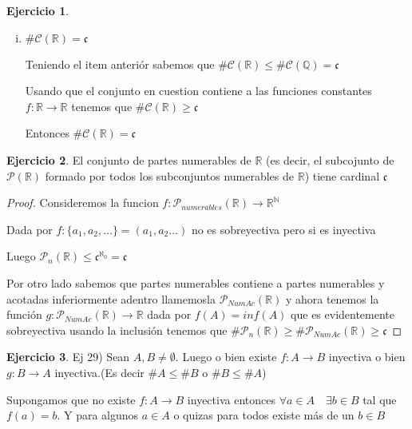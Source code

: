 \documentclass[12pt]{article}
\newcommand{\n}{\aleph_{0}}
\newcommand{\Q}{\mathbb{Q}}
\newcommand{\R}{\mathbb{R}}
\newcommand{\I}{\mathbb{I}}
\newcommand{\N}{\mathbb{N}}
\newcommand{\ra}{\rightarrow}
\theoremstyle{definition}
\newtheorem{ej}{Ejercicio}
\begin{document}
\begin{ej}
\begin{enumerate}[i.]
\begin{proof}
      Ahora tomemos una sucesión $(a_n)_n \in \Q$ tal que $a_n \ra i$ que existe por densidad, entonces por continuidad $f(a_n) \ra f(i) \neq g(i) \leftarrow g(a_n)$

      Como todos los términos de $a_n$ estan en $\Q$ sabemos que $f(a_n) = g(a_n) \quad \forall n \in \N$, pero entonces, dado que ambas convergen, tienen que converger a lo mismo

      Esto es absurdo , por que dijimos que no convergian a lo mismo, provino de suponer que existia dicho $i \in \I$ entonces no existe, por lo tanto $f(x) = g(x) \quad \forall x \in \R$
      \end{proof}
    \item $\# \mathcal{C}(\R) = \mathfrak{c}$

      Teniendo el item anteriór sabemos que $\# \mathcal{C}(\R) \leq \# \mathcal{C}(\Q) = \mathfrak{c}$

      Usando que el conjunto en cuestion contiene a las funciones constantes $f : \R \ra \R $ tenemos que $\# \mathcal{C}(\R) \geq \mathfrak{c}$

      Entonces $\# \mathcal{C}(\R) = \mathfrak{c}$
  \end{enumerate}
  \end{ej}

\noindent 
\begin{ej} El conjunto de partes numerables de $\R$ (es decir, el subcojunto de $\mathcal{P}(\R)$ formado por todos los subconjuntos numerables de $\R$) tiene cardinal $\mathfrak{c}$
\begin{proof}
  Consideremos la funcion $f: \mathcal{P}_{numerables}(\R) \ra \R^{\N}$ 

  Dada por $f : \{ a_{1},a_{2}, \dots \} = (a_{1},a_{2} \dots )$ no es sobreyectiva pero si es inyectiva

  Luego  $\mathcal{P}_{n}(\R) \leq \mathfrak{c}^{\n} = \mathfrak{c}$

  Por otro lado sabemos que partes numerables contiene a partes numerables y acotadas inferiormente adentro llamemosla $\mathcal{P}_{NumAc}(\R)$ y ahora tenemos la función $g: \mathcal{P}_{NumAc}(\R) \ra \R$ dada por $f(A) = inf(A)$ que es evidentemente sobreyectiva usando la inclusión tenemos que $\# \mathcal{P}_{n}(\R) \geq \# \mathcal{P}_{NumAc}(\R) \geq \mathfrak{c}$

\end{proof}
\end{ej}

\begin{ej}
\noindent Ej 29) Sean $A,B \neq \emptyset$. Luego o bien existe $f:A \ra B$ inyectiva o bien $g: B \ra A$ inyectiva.(Es decir $\#A \leq \# B$ o $\#B \leq \# A$) 

Supongamos que no existe $f: A \ra B$ inyectiva entonces $\forall a \in A \quad \exists b \in B $ tal que $f(a) = b$. Y para algunos $a \in A$ o quizas para todos existe más de un $b \in B$


\end{ej}
\end{document}
